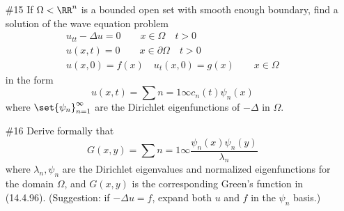 \documentclass[11pt, oneside]{article}
\begin{document}
\begin{enumerate}
\begin{enumerate}
\begin{proof}
          Now if $f \in H_0^1(\Omega)$ then 
          \[
            \sum{n = 1}{\infty}{\abs{\abr[H^1_0(\Omega)]{f, \zeta_n}}^2} < \infty
          \]
          and equivalently
          \[
            \sum{n = 1}{\infty}{\lambda_n \abs{\abr{f, \psi_n}}^2} < \infty.
          \]
          If on the other hand
          \[
            \sum{n = 1}{\infty}{\lambda_n \abs{\abr{f, \psi_n}}^2} < \infty.
          \]
          then
          \[
            \sum{n = 1}{\infty}{\abs{\abr[H^1_0(\Omega)]{f, \zeta_n}}^2} < \infty
          \]
          which implies that $f \in H^1_0(\Omega)$.
        \end{proof}
    \end{enumerate}

  \pagebreak
  \item[\#15]
    If $\Omega < \RR^n$ is a bounded open set with smooth enough boundary, find
    a solution of the wave equation problem
    \begin{align*}
      u_{tt} - \Delta u = 0 \qquad x \in \Omega \quad t > 0 \\
      u(x, t) = 0 \qquad x \in \partial\Omega \quad t > 0 \\
      u(x, 0) = f(x) \quad u_t(x, 0) = g(x) \qquad x \in \Omega
    \end{align*}
    in the form
    \[
      u(x, t) = \sum{n = 1}{\infty}{c_n(t) \psi_n(x)}
    \]
    where $\set{\psi_n}_{n = 1}^{\infty}$ are the Dirichlet eigenfunctions of
    $-\Delta$ in $\Omega$.

  \pagebreak
  \item[\#16]
    Derive formally that
    \[
      G(x, y) = \sum{n=1}{\infty}{\frac{\psi_n(x) \psi_n(y)}{\lambda_n}}
    \]
    where $\lambda_n, \psi_n$ are the Dirichlet eigenvalues and normalized
    eigenfunctions for the domain $\Omega$, and $G(x, y)$ is the corresponding
    Green's function in (14.4.96).
    (Suggestion: if $-\Delta u = f$, expand both $u$ and $f$ in the $\psi_n$
    basis.)

\end{enumerate}
\end{document}
